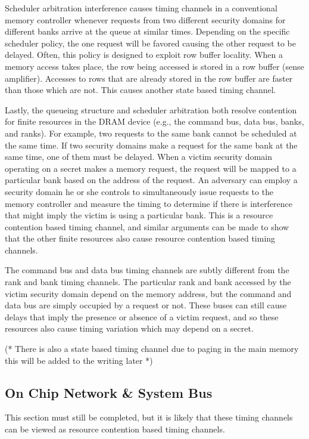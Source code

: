 Scheduler arbitration interference causes timing channels in a conventional 
memory controller whenever requests from two different security domains for 
different banks arrive at the queue at similar times. Depending on the specific 
scheduler policy, the one request will be favored causing the other request to 
be delayed. Often, this policy is designed to exploit row buffer locality. When 
a memory access takes place, the row being accessed is stored in a row buffer 
(sense amplifier). Accesses to rows that are already stored in the row buffer 
are faster than those which are not. This causes another state based timing 
channel.


Lastly, the queueing structure and scheduler arbitration both resolve 
contention for finite resources in the DRAM device (e.g., the command bus, data
bus, banks, and ranks).
For example, two requests to the same bank cannot be scheduled at the same 
time. If two security domains make a request for the same bank at the same 
time, one of them must be delayed.  When a victim security domain operating on 
a secret makes a memory request, the request will be mapped to a particular 
bank based on the address of the request. An adversary can employ a security 
domain he or she controls to simultaneously issue requests to the memory 
controller and measure the timing to determine if there is interference that 
might imply the victim is using a particular bank. This is a resource 
contention based timing channel, and similar arguments can be made to show that 
the other finite resources also cause resource contention based timing 
channels. 

The command bus and data bus timing channels are subtly different from the rank 
and bank timing channels. The particular rank and bank accessed by the victim 
security domain depend on the memory address, but the command and data bus are 
simply occupied by a request or not. These buses can still cause delays that 
imply the presence or absence of a victim request, and so these resources also 
cause timing variation which may depend on a secret.

(* There is also a state based timing channel due to paging in the main memory 
 this will be added to the writing later *)

\subsection{On Chip Network \& System Bus}
This section must still be completed, but it is likely that these timing 
channels can be viewed as resource contention based timing channels.
